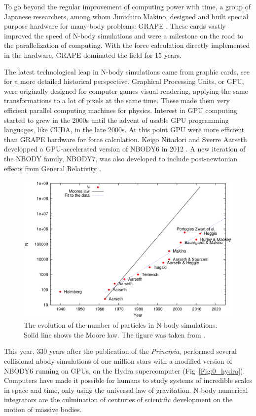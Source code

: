 To go beyond the regular improvement of computing power with time, a group of Japanese researchers, among whom Junichiro Makino, designed and built special purpose hardware for many-body problems: GRAPE \citep{Ebisuzaki1990,Ito1991}. These cards vastly improved the speed of N-body simulations and were a milestone on the road to the parallelization of computing. With the force calculation directly implemented in the hardware, GRAPE dominated the field for 15 years.

The latest technological leap in N-body simulations came from graphic cards, see \cite{Bedorf2012} for a more detailed historical perspective. Graphical Processing Units, or GPU, were originally designed for computer games visual rendering, applying the same transformations to a lot of pixels at the same time. These made them very efficient parallel computing machines for physics. Interest in GPU computing started to grew in the 2000s \citep{Nyland2004,Elsen2006,SPZ2007} until the advent of usable GPU programming languages, like CUDA, in the late 2000s. At this point GPU were more efficient than GRAPE hardware for force calculation. Keigo Nitadori and Sverre Aarseth developped a GPU-accelerated version of NBODY6 in 2012 \citep{Nitadori2012}. A new iteration of the NBODY family, NBODY7, was also developed to include post-newtonian effects from General Relativity \citep{Aarseth2012}.

\begin{figure}
\label{Fig:N_increase}
\includegraphics[width=0.9\linewidth]{Figures/0_N_increase.png}
\caption[The evolution of the number of particles in N-body simulations]{The evolution of the number of particles in N-body simulations. Solid line shows the Moore law. The figure was taken from \protect\cite{Bedorf2012}. }
\end{figure}


This year, 330 years after the publication of the \textit{Principia}, \cite{Wang2016} performed several collisional nbody simulations of one million stars with a modified version of NBODY6 running on GPUs, on the Hydra supercomputer (Fig~\ref{Fig:0_hydra}). Computers have made it possible for humans to study systems of incredible scales in space and time, only using the universal law of gravitation. N-body numerical integrators are the culmination of centuries of scientific development on the motion of massive bodies.